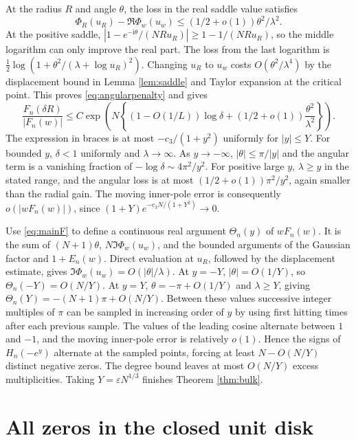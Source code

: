 \documentclass[11pt]{article}
\newcommand{\ii}{\mathrm i}
\begin{document}
At the radius \(R\) and angle \(\theta\), the loss in the real saddle value satisfies
\begin{equation}\label{eq:angularpenalty}
 \Phi_R(u_R)-\Re\Phi_w(u_w)\le(1/2+o(1))\theta^2/\lambda^2.
\end{equation}
At the positive saddle, \(|1-e^{-\ii\theta}/(NRu_R)|\ge1-1/(NRu_R)\), so the middle logarithm can only improve the real part. The loss from the last logarithm is \(\tfrac12\log(1+\theta^2/(\lambda+\log u_R)^2)\). Changing \(u_R\) to \(u_w\) costs \(O(\theta^2/\lambda^4)\) by the displacement bound in Lemma \ref{lem:saddle} and Taylor expansion at the critical point. This proves \eqref{eq:angularpenalty} and gives
\[
 \frac{F_n(\delta R)}{|F_n(w)|}
 \le C\exp\!\left(N\left\{(1-O(1/L))\log\delta
                      +(1/2+o(1))\frac{\theta^2}{\lambda^2}\right\}\right).
\]
The expression in braces is at most \(-c_3/(1+y^2)\) uniformly for \(|y|\le Y\). For bounded \(y\), \(\delta<1\) uniformly and \(\lambda\to\infty\). As \(y\to-\infty\), \(|\theta|\le\pi/|y|\) and the angular term is a vanishing fraction of \(-\log\delta\sim4\pi^2/y^2\). For positive large \(y\), \(\lambda\ge y\) in the stated range, and the angular loss is at most \((1/2+o(1))\pi^2/y^2\), again smaller than the radial gain. The moving inner-pole error is consequently \(o(|wF_n(w)|)\), since \((1+Y)e^{-c_3N/(1+Y^2)}\to0\).

Use \eqref{eq:mainF} to define a continuous real argument \(\Theta_n(y)\) of \(wF_n(w)\). It is the sum of \((N+1)\theta\), \(N\Im\Phi_w(u_w)\), and the bounded arguments of the Gaussian factor and \(1+E_n(w)\). Direct evaluation at \(u_R\), followed by the displacement estimate, gives \(\Im\Phi_w(u_w)=O(|\theta|/\lambda)\). At \(y=-Y\), \(|\theta|=O(1/Y)\), so \(\Theta_n(-Y)=O(N/Y)\). At \(y=Y\), \(\theta=-\pi+O(1/Y)\) and \(\lambda\ge Y\), giving \(\Theta_n(Y)=-(N+1)\pi+O(N/Y)\). Between these values successive integer multiples of \(\pi\) can be sampled in increasing order of \(y\) by using first hitting times after each previous sample. The values of the leading cosine alternate between \(1\) and \(-1\), and the moving inner-pole error is relatively \(o(1)\). Hence the signs of \(H_n(-e^y)\) alternate at the sampled points, forcing at least \(N-O(N/Y)\) distinct negative zeros. The degree bound leaves at most \(O(N/Y)\) excess multiplicities. Taking \(Y=\varepsilon N^{1/3}\) finishes Theorem \ref{thm:bulk}.

\section{All zeros in the closed unit disk}\label{sec:disk}
\end{document}

